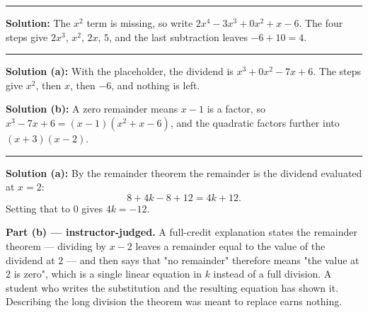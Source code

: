 \documentclass[12pt]{article}
\begin{document}
\vspace{0.15cm}
\noindent\rule{\linewidth}{0.2pt}


\textbf{Solution:} The $x^{2}$ term is missing, so write
$2x^{4} - 3x^{3} + 0x^{2} + x - 6$. The four steps give $2x^{3}$, $x^{2}$,
$2x$, $5$, and the last subtraction leaves $-6 + 10 = 4$.

\vspace{0.15cm}
\noindent\rule{\linewidth}{0.2pt}


\textbf{Solution (a):} With the placeholder, the dividend is
$x^{3} + 0x^{2} - 7x + 6$. The steps give $x^{2}$, then $x$, then $-6$, and
nothing is left. 

\textbf{Solution (b):} A zero remainder means $x - 1$ is a factor, so
$x^{3} - 7x + 6 = (x - 1)(x^{2} + x - 6)$, and the quadratic factors further
into $(x + 3)(x - 2)$. 

\vspace{0.15cm}
\noindent\rule{\linewidth}{0.2pt}


\textbf{Solution (a):} By the remainder theorem the remainder is the dividend
evaluated at $x = 2$:
\[
  8 + 4k - 8 + 12 = 4k + 12.
\]
Setting that to $0$ gives $4k = -12$. 

\textbf{Part (b) --- instructor-judged.} A full-credit explanation states the
remainder theorem --- dividing by $x - 2$ leaves a remainder equal to the value
of the dividend at $2$ --- and then says that "no remainder" therefore means
"the value at $2$ is zero", which is a single linear equation in $k$ instead of
a full division. A student who writes the substitution and the resulting
equation has shown it. Describing the long division the theorem was meant to
replace earns nothing.
\end{document}

